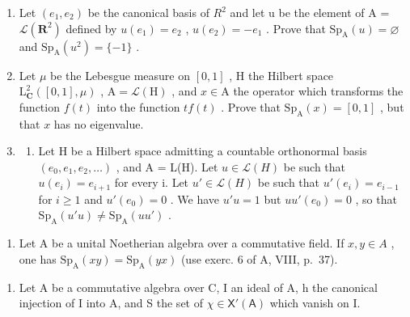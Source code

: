 

\begin{enumerate}
\def\labelenumi{\arabic{enumi})}
\item
  Let \((e_{1}, e_{2})\) be the canonical basis of \(R^{2}\) and let u be the element of A = \(\mathcal{L}(\mathbf{R}^{2})\) defined by \(u(e_{1}) = e_{2}\) , \(u(e_{2}) = -e_{1}\) . Prove that \(\mathrm{Sp}_{\mathrm{A}}(u) = \varnothing\) and \(\mathrm{Sp}_{\mathrm{A}}(u^{2}) = \{-1\}\) .
\item
  Let \(\mu\) be the Lebesgue measure on \([0,1]\) , H the Hilbert space \(\mathrm{L}_{\mathbf{C}}^{2}([0,1],\mu)\) , \(\mathrm{A} = \mathcal{L}(\mathrm{H})\) , and \(x \in \mathrm{A}\) the operator which transforms the function \(f(t)\) into the function \(tf(t)\) . Prove that \(\mathrm{Sp}_{\mathrm{A}}(x) = [0,1]\) , but that \(x\) has no eigenvalue.
\item
  \begin{enumerate}
  \def\labelenumii{\alph{enumii})}
  \tightlist
  \item
    Let H be a Hilbert space admitting a countable orthonormal basis \((e_{0}, e_{1}, e_{2}, \ldots)\) , and A = L(H). Let \(u \in \mathcal{L}(H)\) be such that \(u(e_{i}) = e_{i+1}\) for every i. Let \(u' \in \mathcal{L}(H)\) be such that \(u'(e_{i}) = e_{i-1}\) for \(i \geqslant 1\) and \(u'(e_{0}) = 0\) . We have \(u'u = 1\) but \(uu'(e_{0}) = 0\) , so that \(\mathrm{Sp}_{\mathrm{A}}(u'u) \neq \mathrm{Sp}_{\mathrm{A}}(uu')\) .
  \end{enumerate}
\end{enumerate}

\begin{enumerate}
\def\labelenumi{\alph{enumi})}
\setcounter{enumi}{1}
\tightlist
\item
  Let A be a unital Noetherian algebra over a commutative field. If \(x, y \in A\) , one has \(\mathrm{Sp}_{\mathrm{A}}(xy) = \mathrm{Sp}_{\mathrm{A}}(yx)\) (use exerc. 6 of A, VIII, p.~37).
\end{enumerate}

\begin{enumerate}
\def\labelenumi{\arabic{enumi})}
\setcounter{enumi}{3}
\tightlist
\item
  Let A be a commutative algebra over C, I an ideal of A, h the canonical injection of I into A, and S the set of \(\chi \in \mathsf{X}'(\mathsf{A})\) which vanish on I.
\end{enumerate}

